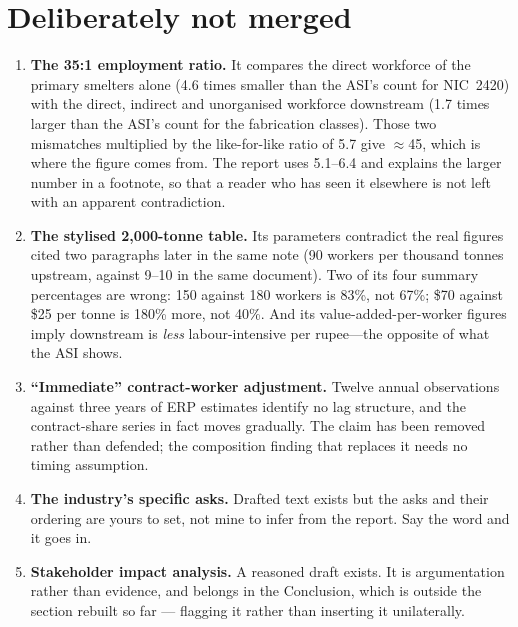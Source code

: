 \documentclass[11pt, a4paper]{article}
\begin{document}
\section{Deliberately not merged}

\begin{enumerate}[leftmargin=1.5em, itemsep=4pt]

\item \textbf{The 35:1 employment ratio.} It compares the direct workforce of the
primary smelters alone (4.6 times smaller than the ASI's count for NIC~2420) with the
direct, indirect and unorganised workforce downstream (1.7 times larger than the ASI's
count for the fabrication classes). Those two mismatches multiplied by the
like-for-like ratio of 5.7 give $\approx$45, which is where the figure comes from. The
report uses 5.1--6.4 and explains the larger number in a footnote, so that a reader
who has seen it elsewhere is not left with an apparent contradiction.

\item \textbf{The stylised 2,000-tonne table.} Its parameters contradict the real
figures cited two paragraphs later in the same note (90 workers per thousand tonnes
upstream, against 9--10 in the same document). Two of its four summary percentages are
wrong: 150 against 180 workers is 83\%, not 67\%; \$70 against \$25 per tonne is 180\%
more, not 40\%. And its value-added-per-worker figures imply downstream is \emph{less}
labour-intensive per rupee---the opposite of what the ASI shows.

\item \textbf{``Immediate'' contract-worker adjustment.} Twelve annual observations
against three years of ERP estimates identify no lag structure, and the contract-share
series in fact moves gradually. The claim has been removed rather than defended; the
composition finding that replaces it needs no timing assumption.

\item \textbf{The industry's specific asks.} Drafted text exists but the asks and
their ordering are yours to set, not mine to infer from the report. Say the word and
it goes in.

\item \textbf{Stakeholder impact analysis.} A reasoned draft exists. It is
argumentation rather than evidence, and belongs in the Conclusion, which is outside
the section rebuilt so far --- flagging it rather than inserting it unilaterally.

\end{enumerate}
\end{document}
